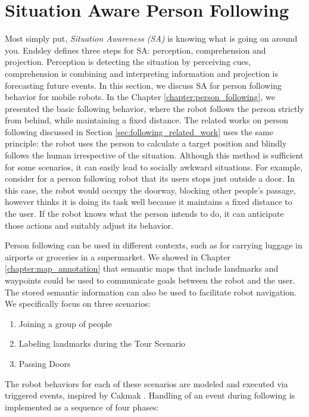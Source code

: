 \chapter{Situation Aware Person Following}
\label{chapter:following_situation_aware}

Most simply put, \textit{Situation Awareness (SA)} is knowing what is going on around you. Endsley \cite{endsley2000situation} defines three steps for SA: perception, comprehension and projection. Perception is detecting the situation by perceiving cues, comprehension is combining and interpreting information and projection is forecasting future events. In this section, we discuss SA for person following behavior for mobile robots. In the Chapter \ref{chapter:person_following}, we presented the basic following behavior, where the robot follows the person strictly from behind, while maintaining a fixed distance. The related works on person following discussed in Section \ref{sec:following_related_work} uses the same principle: the robot uses the person to calculate a target position and blindly follows the human irrespective of the situation. Although this method is sufficient for some scenarios, it can easily lead to socially awkward situations. For example, consider for a person following robot that its users stops just outside a door. In this case, the robot would occupy the doorway, blocking other people's passage, however thinks it is doing its task well because it maintains a fixed distance to the user. If the robot knows what the person intends to do, it can anticipate those actions and suitably adjust its behavior.

Person following can be used in different contexts, such as for carrying luggage in airports or groceries in a supermarket. We showed in Chapter \ref{chapter:map_annotation} that semantic maps that include landmarks and waypoints could be used to communicate goals between the robot and the user.  The stored semantic information can also be used to facilitate robot navigation. We specifically focus on three scenarios:

\begin{enumerate}
\item Joining a group of people
\item Labeling landmarks during the Tour Scenario
\item Passing Doors
\end{enumerate}

The robot behaviors for each of these scenarios are modeled and executed via triggered events, inspired by Cakmak \cite{cakmak2011using}. Handling of an event during following is implemented as a sequence of four phases:

